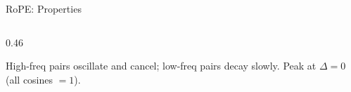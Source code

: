 \begin{frame}{RoPE: Properties}
\begin{columns}[T]
\begin{column}{0.46\textwidth}
\begin{center}
      \end{center}
      \vspace{-0.5em}
      {\scriptsize High-freq pairs oscillate and cancel; low-freq pairs decay slowly. Peak at $\Delta{=}0$ (all cosines $= 1$).}
    \end{column}
  \end{columns}

\end{frame}


